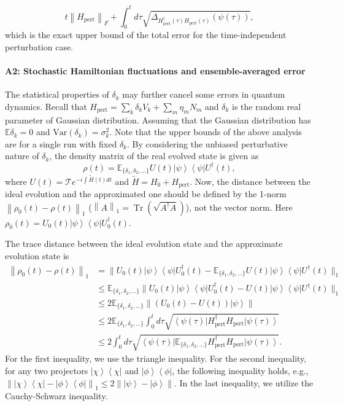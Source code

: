 \documentclass[12pt]{article}
\newcommand{\ket}[1]{\left|#1\right\rangle}
\newcommand{\bra}[1]{\left\langle #1\right|}
\newcommand{\norm}[1]{\left\lVert #1\right\rVert}
\newcommand{\Tr}{\operatorname{Tr}}
\begin{document}
\begin{equation}
     t\norm{H_{\text{pert}}}_F+\int_{0} ^{t} d\tau  \sqrt{\Delta_{{H^\dagger_{\text{pert}}(\tau)H_{\text{pert}}(\tau)}} (\psi(\tau))},
\end{equation}
which is the exact upper bound of the total error for the time-independent perturbation case.

\paragraph*{A2: Stochastic Hamiltonian fluctuations and ensemble-averaged error}
The statistical properties of $\delta_k$ may further cancel some errors in quantum dynamics.
Recall that $ H_{\text{pert}} = \sum_k \delta_k V_k + \sum_m \eta_m N_m$ and $\delta_k$ is the random real parameter of  Gaussian distribution. Assuming that the  Gaussian distribution has $\mathbb{E} \delta _k=0$ and $\text{Var}(\delta_k)=\sigma^2_k$.  Note that the upper bounds of the above analysis are for a single run with fixed $\delta_k$. By considering the unbiased perturbative nature of $\delta_k$, the density matrix of the real evolved state is given as 
$$\rho(t)= \mathbb{E}_{\{\delta_1,\delta_2,...\}}U (t)\ket{\psi}\bra{\psi}U^\dagger(t),$$ where 
$U(t)=\mathcal{T}e^{-i\int \widetilde{H}(t) dt}$ and $\widetilde{H}=H_0+H_{\text{pert}}$.
Now, the distance between the ideal evolution and the approximated one should be defined by the 1-norm $\norm{\rho_0(t)-\rho(t)}_1$ ($\norm{A}_1=\Tr(\sqrt{A^\dagger A})$), not the vector norm. Here $\rho_0(t)=U_0(t)\ket{\psi}\bra{\psi}U^\dagger_0(t) $.





The trace distance between the ideal evolution state and the approximate evolution state is 
\begin{equation}
\begin{split}
\norm{ \rho_0(t)-\rho(t) }_1 &=\|U_0(t)\ket{\psi}\bra{\psi}U^\dagger _0(t) -  \mathbb{E}_{\{\delta_1,\delta_2,...\}} U (t)\ket{\psi}\bra{\psi}U^\dagger(t)\|_1\\
&\le   \mathbb{E}_{\{\delta_1,\delta_2,...\}} \|U_0 (t)\ket{\psi}\bra{\psi}U^\dagger_0(t) - U (t)\ket{\psi}\bra{\psi}U^\dagger(t)\|_1\\
& \le 2   \mathbb{E}_{\{\delta_1,\delta_2,...\}} \norm{(U_0(t)-U(t))\ket{\psi}} \\
& \le 2  \mathbb{E}_{\{\delta_1,\delta_2,...\}}\int_0 ^t d\tau \sqrt{\bra{\psi(\tau)} H_{\text{pert}}^\dagger H_{\text{pert}} \ket{\psi(\tau)}}\\
& \le 2 \int_0 ^t d\tau \sqrt{\bra{\psi(\tau)}   \mathbb{E}_{\{\delta_1,\delta_2,...\}}H_{\text{pert}}^\dagger H_{\text{pert}} \ket{\psi(\tau)}}.
\end{split}
\end{equation}
 For the first inequality, we use the triangle inequality. For the second inequality, for any two projectors $\ket{\chi}\bra{\chi}$ and $\ket{\phi}\bra{\phi}$, the following inequality holds, e.g., $\norm{\ket{\chi}\bra{\chi}-\ket{\phi}\bra{\phi}}_1\le 
2 \norm{\ket{\psi}-\ket{\phi}}$. In the last inequality, we utilize the Cauchy-Schwarz inequality. 
\end{document}
